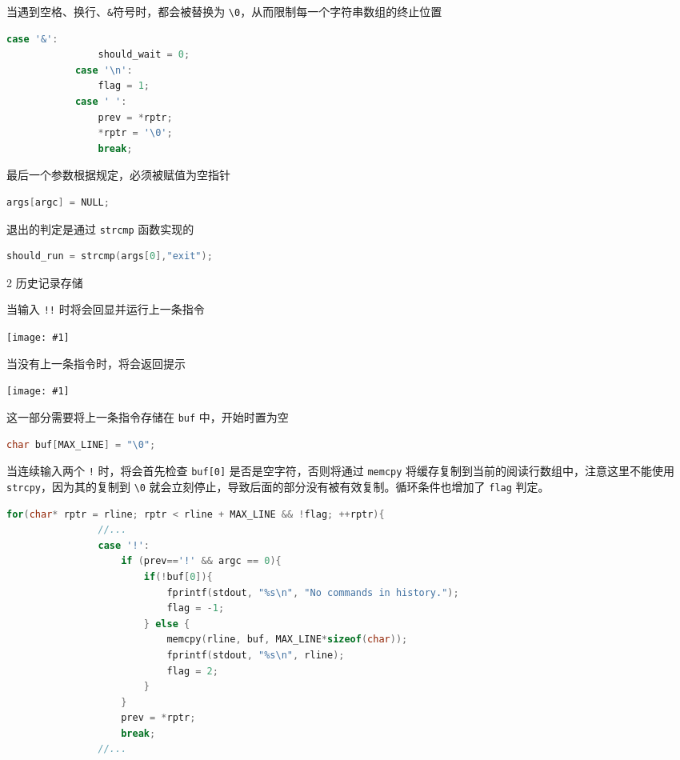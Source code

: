 \documentclass[12pt,a4paper]{article}
\newenvironment{problems}{\begin{list}{}{\renewcommand{\makelabel}[1]{\textbf{##1}\hfil}}}{\end{list}}
\newenvironment{steps}{\begin{list}{}{\renewcommand{\makelabel}[1]{##1.\hfil}}}{\end{list}}
\providecommand{\img}[1]{\texttt{[image: \#1]}}
\begin{document}
\begin{problems}
\begin{steps}
        

        当遇到空格、换行、\verb"&"符号时，都会被替换为 \verb"\0"，从而限制每一个字符串数组的终止位置
        \begin{lstlisting}[language=c]
            case '&':
                should_wait = 0;
            case '\n':
                flag = 1;
            case ' ':
                prev = *rptr;
                *rptr = '\0';
                break;
        \end{lstlisting}

        最后一个参数根据规定，必须被赋值为空指针
        \begin{lstlisting}[language=c]
            args[argc] = NULL;
        \end{lstlisting}

        退出的判定是通过 \verb"strcmp" 函数实现的
        \begin{lstlisting}[language=c]
            should_run = strcmp(args[0],"exit");
        \end{lstlisting}

        \item[2] 历史记录存储
        
        当输入 \verb"!!" 时将会回显并运行上一条指令

        \img{history.png}

        当没有上一条指令时，将会返回提示

        \img{nohist.png}

        这一部分需要将上一条指令存储在 \texttt{buf} 中，开始时置为空
        \begin{lstlisting}[language=c]
            char buf[MAX_LINE] = "\0";
        \end{lstlisting}

        当连续输入两个 \verb"!" 时，将会首先检查 \verb"buf[0]" 是否是空字符，否则将通过 \verb"memcpy" 将缓存复制到当前的阅读行数组中，注意这里不能使用 \verb"strcpy"，因为其的复制到 \verb"\0" 就会立刻停止，导致后面的部分没有被有效复制。循环条件也增加了 \verb"flag" 判定。
        \begin{lstlisting}[language=c]
            for(char* rptr = rline; rptr < rline + MAX_LINE && !flag; ++rptr){
                //...
                case '!':
                    if (prev=='!' && argc == 0){
                        if(!buf[0]){
                            fprintf(stdout, "%s\n", "No commands in history.");
                            flag = -1;
                        } else {
                            memcpy(rline, buf, MAX_LINE*sizeof(char));
                            fprintf(stdout, "%s\n", rline);
                            flag = 2;
                        }
                    }
                    prev = *rptr;
                    break;
                //...
        \end{lstlisting}


\end{steps}
\end{problems}
\end{document}
